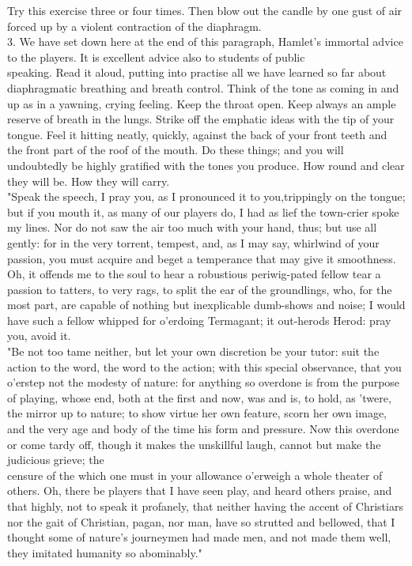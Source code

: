 \documentclass[10pt]{article}
\begin{document}
Try this exercise three or four times. Then blow out the candle by one gust of air forced up by a violent contraction of the diaphragm.\\
3. We have set down here at the end of this paragraph, Hamlet's immortal advice to the players. It is excellent advice also to students of public\\
speaking. Read it aloud, putting into practise all we have learned so far about diaphragmatic breathing and breath control. Think of the tone as coming in and up as in a yawning, crying feeling. Keep the throat open. Keep always an ample reserve of breath in the lungs. Strike off the emphatic ideas with the tip of your tongue. Feel it hitting neatly, quickly, against the back of your front teeth and the front part of the roof of the mouth. Do these things; and you will undoubtedly be highly gratified with the tones you produce. How round and clear they will be. How they will carry.\\
"Speak the speech, I pray you, as I pronounced it to you,trippingly on the tongue; but if you mouth it, as many of our players do, I had as lief the town-crier spoke my lines. Nor do not saw the air too much with your hand, thus; but use all gently: for in the very torrent, tempest, and, as I may say, whirlwind of your passion, you must acquire and beget a temperance that may give it smoothness. Oh, it offends me to the soul to hear a robustious periwig-pated fellow tear a passion to tatters, to very rags, to split the ear of the groundlings, who, for the most part, are capable of nothing but inexplicable dumb-shows and noise; I would have such a fellow whipped for o'erdoing Termagant; it out-herods Herod: pray you, avoid it.\\
"Be not too tame neither, but let your own discretion be your tutor: suit the action to the word, the word to the action; with this special observance, that you o'erstep not the modesty of nature: for anything so overdone is from the purpose of playing, whose end, both at the first and now, was and is, to hold, as 'twere, the mirror up to nature; to show virtue her own feature, scorn her own image, and the very age and body of the time his form and pressure. Now this overdone or come tardy off, though it makes the unskillful laugh, cannot but make the judicious grieve; the\\
censure of the which one must in your allowance o'erweigh a whole theater of others. Oh, there be players that I have seen play, and heard others praise, and that highly, not to speak it profanely, that neither having the accent of Christiars nor the gait of Christian, pagan, nor man, have so strutted and bellowed, that I thought some of nature's journeymen had made men, and not made them well, they imitated humanity so abominably."
\end{document}
